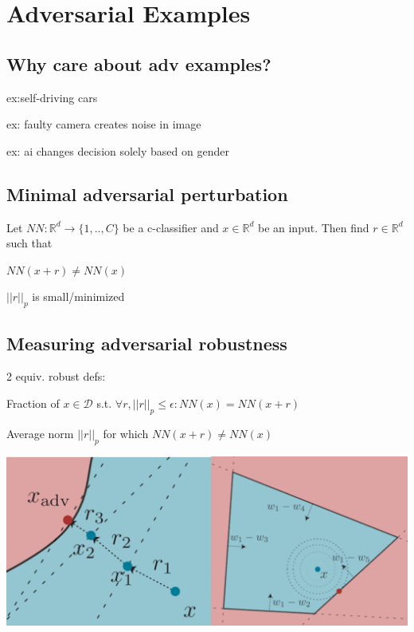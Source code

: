 \section{Adversarial Examples}

\subsection*{Why care about adv examples?}
\begin{inparaitem}[$\color{mygreen} \triangleright$]
\item {} ex:self-driving cars
\item {} ex: faulty camera creates noise in image
\item {} ex: ai changes decision solely based on gender
\end{inparaitem}

\subsection*{Minimal adversarial perturbation} Let $NN: \mathbb{R}^d \rightarrow \{1,..,C\} $ be a c-classifier and $x \in \mathbb{R}^d$ be an input. Then find $r \in \mathbb{R}^d$ such that \begin{inparaitem}[$\color{mygreen} \triangleright$]
\item $NN(x+r) \ne NN(x)$
\item $||r||_p$ is small/minimized
\end{inparaitem}
\subsection*{Measuring adversarial robustness} 2 equiv. robust defs:
\begin{inparaitem}[$\color{mygreen} \triangleright$]
\item Fraction of $x\in\mathcal{D}$ s.t. $\forall r, ||r||_p \le \epsilon: NN(x) = NN(x+r)$
\item Average norm $||r||_p$ for which $NN(x+r) \ne NN(x)$
\end{inparaitem}

\includegraphics[width=\textwidth/5]{ETH-DS-2020/AML/Resources/adv_examples3.png}
